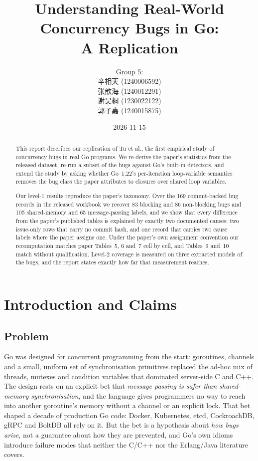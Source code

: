 \documentclass[11pt]{article}
\title{\bfseries Understanding Real-World Concurrency Bugs in Go:\\
A Replication}
\author{Group 5:\\
辛相天 (1240006592) \\ 张歆海 (1240012291) \\ 谢昊桐 (1230022122) \\ 郭子嘉 (1240015875)}
\date{2026-11-15}
\newcommand{\etal}{et al.}
\begin{document}

\maketitle
\thispagestyle{empty}

\begin{abstract}
This report describes our replication of Tu \etal{}\cite{go-study}, the first
empirical study of concurrency bugs in real Go programs. We re-derive the
paper's statistics from the released dataset, re-run a subset of the bugs
against Go's built-in detectors, and extend the study by asking whether
Go~1.22's per-iteration loop-variable semantics removes the bug class the
paper attributes to closures over shared loop variables.

Our level-1 results reproduce the paper's taxonomy. Over the 169
commit-backed bug records in the released workbook we recover 83 blocking and
86 non-blocking bugs and 105 shared-memory and 65 message-passing labels, and
we show that every difference from the paper's published tables is explained
by exactly two documented causes: two issue-only rows that carry no commit
hash, and one record that carries two cause labels where the paper assigns
one. Under the paper's own assignment convention our recomputation matches
paper Tables~5, 6 and~7 cell by cell, and Tables~9 and~10 match without
qualification. Level-2 coverage is measured on three extracted models of the
bugs, and the report states exactly how far that measurement reaches.
\end{abstract}

\section{Introduction and Claims}

\subsection{Problem}

Go was designed for concurrent programming from the start: goroutines,
channels and a small, uniform set of synchronisation primitives replaced
the ad-hoc mix of threads, mutexes and condition variables that dominated
server-side C and C++. The design rests on an explicit bet that
\emph{message passing is safer than shared-memory synchronisation}, and the
language gives programmers no way to reach into another goroutine's memory
without a channel or an explicit lock. That bet shaped a decade of
production Go code: Docker, Kubernetes, etcd, CockroachDB, gRPC and BoltDB
all rely on it. But the bet is a hypothesis about \emph{how bugs arise},
not a guarantee about how they are prevented, and Go's own idioms introduce
failure modes that neither the C/C++ nor the Erlang/Java literature covers.
\end{document}
